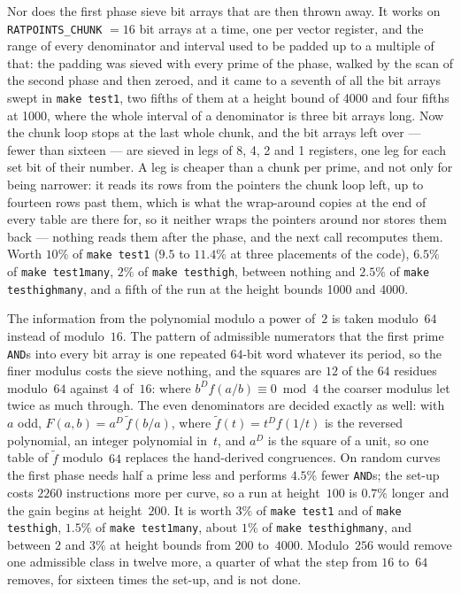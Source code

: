 \documentclass[12pt,a4paper,oneside]{amsart}
\begin{document}
Nor does the first phase sieve bit arrays that are then thrown away. It works
on \texttt{RATPOINTS\_CHUNK} $= 16$ bit arrays at a time, one per vector
register, and the range of every denominator and interval used to be padded
up to a multiple of that: the padding was sieved with every prime of the
phase, walked by the scan of the second phase and then zeroed, and it came to
a seventh of all the bit arrays swept in \texttt{make test1}, two fifths of
them at a height bound of 4000 and four fifths at 1000, where the whole
interval of a denominator is three bit arrays long. Now the chunk loop stops
at the last whole chunk, and the bit arrays left over --- fewer than
sixteen --- are sieved in legs of 8, 4, 2 and 1 registers, one leg for each
set bit of their number. A leg is cheaper than a chunk per prime, and not
only for being narrower: it reads its rows from the pointers the chunk loop
left, up to fourteen rows past them, which is what the wrap-around copies at
the end of every table are there for, so it neither wraps the pointers
around nor stores them back --- nothing reads them after the phase, and the
next call recomputes them. Worth $10\%$ of \texttt{make test1} ($9.5$ to
$11.4\%$ at three placements of the code), $6.5\%$ of \texttt{make
test1many}, $2\%$ of \texttt{make testhigh}, between nothing and $2.5\%$
of \texttt{make testhighmany}, and a fifth of the run at the height bounds
1000 and 4000.

The information from the polynomial modulo a power of~$2$ is taken
modulo~$64$ instead of modulo~$16$. The pattern of admissible numerators
that the first prime \texttt{AND}s into every bit array is one repeated
$64$-bit word whatever its period, so the finer modulus costs the sieve
nothing, and the squares are $12$ of the $64$ residues modulo~$64$ against
$4$ of~$16$: where $b^D f(a/b) \equiv 0 \bmod 4$ the coarser modulus let
twice as much through. The even denominators are decided exactly as well:
with $a$ odd, $F(a,b) = a^D\, \tilde f(b/a)$, where $\tilde f(t) = t^D
f(1/t)$ is the reversed polynomial, an integer polynomial in~$t$, and $a^D$
is the square of a unit, so one table of $\tilde f$ modulo~$64$ replaces
the hand-derived congruences. On random curves the first phase needs half
a prime less and performs $4.5\%$ fewer \texttt{AND}s; the set-up costs
$2260$ instructions more per curve, so a run at height~$100$ is $0.7\%$
longer and the gain begins at height~$200$. It is worth $3\%$ of
\texttt{make test1} and of \texttt{make testhigh}, $1.5\%$ of \texttt{make
test1many}, about $1\%$ of \texttt{make testhighmany}, and between $2$
and $3\%$ at height bounds from $200$ to~$4000$. Modulo~$256$ would remove
one admissible class in twelve more, a quarter of what the step from $16$
to~$64$ removes, for sixteen times the set-up, and is not done.
\end{document}
